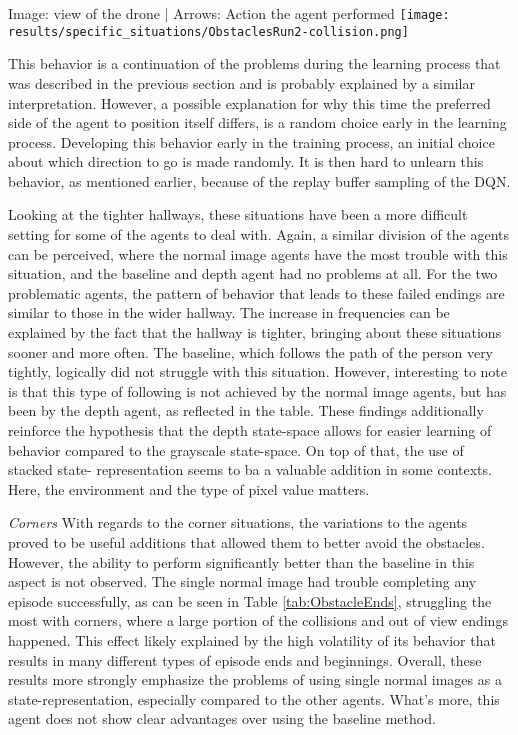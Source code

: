 \begin{Figure}
    \centering
    \small
    Image: view of the drone $|$ Arrows: Action the agent performed
    \texttt{[image: results/specific\_situations/ObstaclesRun2-collision.png]}
    \label{im:run2crashes}
\end{Figure}

This behavior is a continuation of the problems during the learning process that was 
described in the previous section and is probably explained by a similar interpretation.
However, a possible explanation for why this time the preferred side of the agent to position 
itself differs, is a random choice early in the learning process. Developing this behavior 
early in the training process, an initial choice about which direction to go is made randomly.
It is then hard to unlearn this behavior, as mentioned earlier, because of the replay 
buffer sampling of the DQN. 

Looking at the tighter hallways, these situations have been a more difficult setting for some 
of the agents to 
deal with. Again, a similar division of the agents can be perceived, where the normal 
image agents have the most trouble with this situation, and the baseline and 
depth agent had no problems at all. For the two problematic agents, the pattern of 
behavior that leads to these failed endings are similar to those in the 
wider hallway. The increase in frequencies can be explained by the fact that 
the hallway is tighter, bringing about these situations sooner and more often. 
The baseline, which follows the path of the person very tightly, logically did not 
struggle with this situation. However, interesting to note is that this type of 
following is not achieved by the normal image agents, but has been by the depth 
agent, as reflected in the table. These findings additionally reinforce the 
hypothesis that the depth state-space allows for easier learning of behavior 
compared to the grayscale state-space. On top of that, the use of stacked state-
representation seems to ba a valuable addition in some contexts. Here, the 
environment and the type of pixel value matters.   \newline

\noindent
\textit{Corners} \newline
With regards to the corner situations, the variations to the agents proved to be 
useful additions that allowed them to better avoid the obstacles. 
However, the ability to perform significantly better than the baseline in this aspect is 
not observed. The single normal image had trouble completing 
any episode successfully, as can be seen in Table \ref{tab:ObstacleEnds}, 
struggling the most with corners, where a large portion of the collisions 
and out of view endings happened. This effect likely explained 
by the high volatility of its behavior that results in many different types of 
episode ends and beginnings. Overall, these results more strongly emphasize 
the problems of using single normal images as a state-representation, especially 
compared to the other agents. What's more, this agent does not show clear 
advantages over using the baseline method.  


